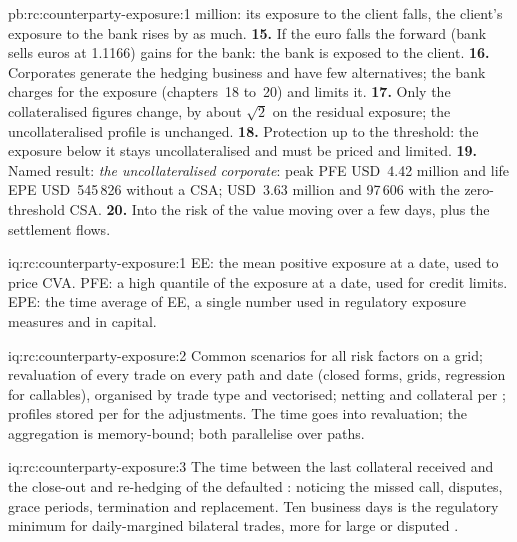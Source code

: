 \begin{solution}{pb:rc:counterparty-exposure:1}
million: its exposure to the client falls, the client's exposure to the bank rises by as much.
\textbf{15.} If the euro falls the forward (bank sells euros at 1.1166) gains for the bank: the
bank is exposed to the client.
\textbf{16.} Corporates generate the hedging business and have few alternatives; the bank
charges for the exposure (chapters~18 to~20) and limits it.
\textbf{17.} Only the collateralised figures change, by about $\sqrt2$ on the residual exposure;
the uncollateralised profile is unchanged.
\textbf{18.} Protection up to the threshold: the exposure below it stays uncollateralised and
must be priced and limited.
\textbf{19.} Named result: \emph{the uncollateralised corporate}: peak PFE USD~4.42 million and
life EPE USD~545\,826 without a CSA; USD~3.63 million and 97\,606 with the zero-threshold CSA.
\textbf{20.} Into the risk of the value moving over a few days, plus the settlement flows.
\end{solution}

\begin{solution}{iq:rc:counterparty-exposure:1}
EE: the mean positive exposure at a date, used to price CVA. PFE: a high quantile of the
exposure at a date, used for credit limits. EPE: the time average of EE, a single number
used in regulatory exposure measures and in capital.
\end{solution}

\begin{solution}{iq:rc:counterparty-exposure:2}
Common scenarios for all risk factors on a grid; revaluation of every trade on every path
and date (closed forms, grids, regression for callables), organised by trade type and
vectorised; netting and collateral per ; profiles stored per  for
the adjustments. The time goes into revaluation; the aggregation is memory-bound; both
parallelise over paths.
\end{solution}

\begin{solution}{iq:rc:counterparty-exposure:3}
The time between the last collateral received and the close-out and re-hedging of the
defaulted : noticing the missed call, disputes, grace periods, termination and
replacement. Ten business days is the regulatory minimum for daily-margined bilateral
trades, more for large or disputed .
\end{solution}

